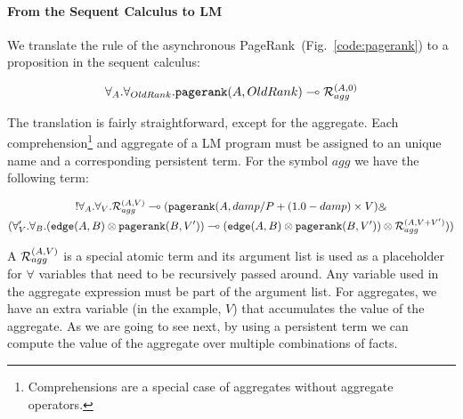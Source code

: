 \paragraph{From the Sequent Calculus to LM}

\newcommand{\agg}[2]{\mathcal{R}_{#1}^{(#2)}}

We translate the rule of the asynchronous PageRank~(Fig.~\ref{code:pagerank}) to
a proposition in the sequent calculus:

\vspace{-3mm}

{\stuffsize
\begin{align}
   \forall_A. \forall_{OldRank}. \mathtt{pagerank}(A, OldRank) \multimap
   \mathcal{R}_{agg}^{(A, 0)}
\end{align}
\vspace{-5mm}
}

The translation is fairly straightforward, except for the aggregate. Each
comprehension\footnote{Comprehensions are a special case of aggregates without
aggregate operators.} and aggregate of a LM program must be assigned to an
unique name and a corresponding persistent term. For the symbol $agg$ we have
the following term:

{\stuffsize
\vspace{-3mm}
\begin{multline}
   {!} \forall_A. \forall_V. \mathcal{R}_{agg}^{(A, V)} \multimap (\mathtt{pagerank}(A,
   damp/P + (1.0 - damp) \times V) \mathbin{\binampersand} \\ (\forall_V'. \forall_B.
   (\mathtt{edge}(A, B) \otimes \mathtt{pagerank}(B, V')) \multimap
   (\mathtt{edge}(A, B) \otimes \mathtt{pagerank}(B, V')) \otimes \mathcal{R}_{agg}^{(A, V
   + V')}))
\end{multline}
\vspace{-5mm}
}

A $\mathcal{R}_{agg}^{(A, V)}$ is a special atomic term and its argument list is used
as a placeholder for $\forall$ variables that need to be recursively passed
around. Any variable used in the aggregate expression must be part of the
argument list.  For aggregates, we have an extra variable (in the example, $V$)
that accumulates the value of the aggregate. As we are going to see next, by
using a persistent term we can compute the value of the aggregate over multiple
combinations of facts.
